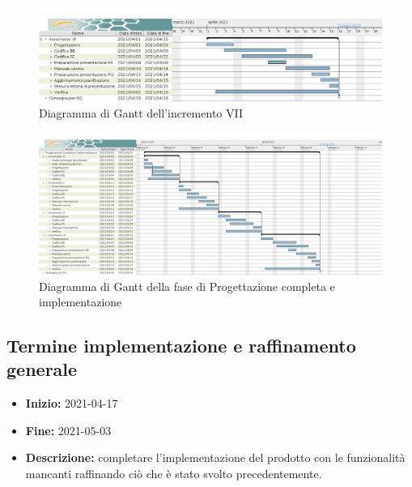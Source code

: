 \begin{figure}[H]
    \centering
    \includegraphics[width=1\linewidth]{res/images/pianificazione/incremento_7.png}
    \caption{Diagramma di Gantt dell'incremento VII}
    \label{fig:_Gantt incremento VII}
\end{figure}

\begin{figure}[H]
    \centering
    \includegraphics[width=1\linewidth]{res/images/pianificazione/progettazione_completa_e_implementazione.png}
    \caption{Diagramma di Gantt della fase di Progettazione completa e implementazione}
    \label{fig:_Gantt progettazione completa e implementazione}
\end{figure}



\subsection{Termine implementazione e raffinamento generale} \label{_pianificazioneTermineImplementazione}
\begin{itemize}
    \item [] \textbf{Inizio:} 2021-04-17
    \item [] \textbf{Fine:} 2021-05-03
    \item [] \textbf{Descrizione:} completare l'implementazione del prodotto con le funzionalità mancanti raffinando ciò che è stato svolto precedentemente.
\end{itemize}

